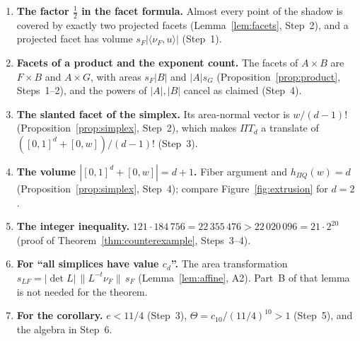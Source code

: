\documentclass[11pt]{article}
\begin{document}
\begin{enumerate}[leftmargin=2em]
\item \textbf{The factor \(\tfrac12\) in the facet formula.} Almost
 every point of the shadow is covered by exactly two projected facets
 (Lemma~\ref{lem:facets}, Step~2), and a projected facet has volume
 \(s_F|\langle\nu_F,u\rangle|\) (Step~1).
\item \textbf{Facets of a product and the exponent count.} The facets
 of \(A\times B\) are \(F\times B\) and \(A\times G\), with areas
 \(s_F|B|\) and \(|A|s_G\) (Proposition~\ref{prop:product}, Steps~1--2),
 and the powers of \(|A|,|B|\) cancel as claimed (Step~4).
\item \textbf{The slanted facet of the simplex.} Its area-normal vector
 is \(w/(d-1)!\) (Proposition~\ref{prop:simplex}, Step~2), which makes
 \(\Pi T_d\) a translate of \(([0,1]^d+[0,w])/(d-1)!\) (Step~3).
\item \textbf{The volume \(|[0,1]^d+[0,w]|=d+1\).} Fiber argument and
 \(h_{\Pi Q}(w)=d\) (Proposition~\ref{prop:simplex}, Step~4); compare
 Figure~\ref{fig:extrusion} for \(d=2\).
\item \textbf{The integer inequality.}
 \(121\cdot184\,756=22\,355\,476>22\,020\,096=21\cdot2^{20}\)
 (proof of Theorem~\ref{thm:counterexample}, Steps~3--4).
\item \textbf{For ``all simplices have value \(c_d\)''.} The area
 transformation \(s_{LF}=|\det L|\,\|L^{-t}\nu_F\|\,s_F\)
 (Lemma~\ref{lem:affine}, A2). Part~B of that lemma is not needed for
 the theorem.
\item \textbf{For the corollary.} \(e<11/4\) (Step~3),
 \(\Theta=c_{10}/(11/4)^{10}>1\) (Step~5), and the algebra in Step~6.
\end{enumerate}
\end{document}
